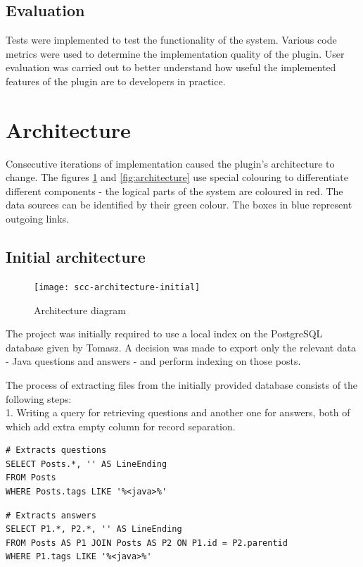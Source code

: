 \documentclass{l4proj}
\begin{document}
\subsection{Evaluation}
Tests were implemented to test the functionality of the system. Various code metrics were used to determine the implementation quality of the plugin. User evaluation was carried out to better understand how useful the implemented features of the plugin are to developers in practice. 

\newpage
\section{Architecture}
Consecutive iterations of implementation caused the plugin's architecture to change. The figures \ref{fig:architecture-initial} and \ref{fig:architecture} use special colouring to differentiate different components - the logical parts of the system are coloured in red. The data sources can be identified by their green colour. The boxes in blue represent outgoing links.

\subsection{Initial architecture}

\begin{figure}[H]
\texttt{[image: scc-architecture-initial]}
\centering
\caption{Architecture diagram}\label{scc-architecture-initial}
\label{fig:architecture-initial}
\end{figure}

The project was initially required to use a local index on the PostgreSQL database given by Tomasz. A decision was made to export only the relevant data - Java questions and answers - and perform indexing on those posts. 

The process of extracting files from the initially provided database consists of the following steps:\\
1. Writing a query for retrieving questions and another one for answers, both of which add extra empty column for record separation.\\

\begin{lstlisting}
# Extracts questions
SELECT Posts.*, '' AS LineEnding
FROM Posts
WHERE Posts.tags LIKE '%<java>%'
\end{lstlisting}

\begin{lstlisting}
# Extracts answers
SELECT P1.*, P2.*, '' AS LineEnding
FROM Posts AS P1 JOIN Posts AS P2 ON P1.id = P2.parentid
WHERE P1.tags LIKE '%<java>%'
\end{lstlisting}
\end{document}
